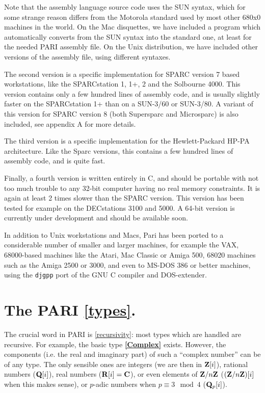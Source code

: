 Note that the assembly language source code uses the SUN syntax,
which for some strange reason differs from the Motorola standard used by
most other 680x0 machines in the world. On the Mac disquettes, we have
included a program which automatically converts
from the SUN syntax into the standard one, at least for the needed PARI
assembly file. On the Unix distribution, we have included other versions
of the assembly file, using different syntaxes. 

The second version is a specific implementation for SPARC version 7 based
workstations, like the SPARCstation 1, 1+, 2 and the Solbourne 4000. This
version contains only a few hundred lines of assembly code, and is usually
slightly faster on the SPARCstation 1+ than on a SUN-3/60 or SUN-3/80.
A variant of this version for SPARC version 8 (both Supersparc and Microsparc)
is also included, see appendix A for more details.

The third version is a specific implementation for the Hewlett-Packard HP-PA
architecture. Like the Sparc versions, this contains a few hundred lines of 
assembly code, and is quite fast.

Finally, a fourth version is written entirely in C, and should be portable with
not too much trouble to any 32-bit computer having no real memory constraints.
It is again at least 2 times slower than the SPARC version. This version has 
been tested for example on the DECstations 3100 and 5000. A 64-bit version
is currently under development and should be available soon.

In addition to Unix workstations and Macs, Pari has been ported to a 
considerable number of smaller and larger machines, for example the VAX,
68000-based machines like the Atari, Mac Classic or Amiga 500, 68020 machines
such as the Amiga 2500 or 3000, and even to MS-DOS 386 or better machines, 
using the {\tt djgpp} port of the GNU C compiler and DOS-extender.

\section{The PARI \ref{types}.}

The crucial word in PARI is \ref{recursivity}: most types
which are handled are recursive. For example, the basic type {\bf
\ref{Complex}} exists. However, the components (i.e. the real and imaginary part)
of
such a ``complex number'' can be of any type. The only sensible ones are
integers
(we are then in $\Bbb Z[i]$), rational numbers ($\Bbb Q[i]$), real numbers
($\Bbb R[i]=\Bbb C$), or even elements of $\Bbb Z/n\Bbb Z$
($(\Bbb Z/n\Bbb Z)[i]$ when this makes sense), or $p$-adic numbers when
$p\equiv 3 \mod 4$ ($\Bbb Q_{p}[i]$).

